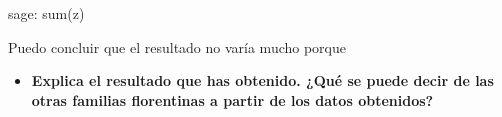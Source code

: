 \begin{sagecommandline}
    sage: sum(z)
\end{sagecommandline}

Puedo concluir que el resultado no varía mucho porque 

\newpage 
\begin{ejer}
    \begin{itemize}
        \item \textbf{Explica el resultado que has obtenido. ¿Qué se puede decir de las otras familias florentinas a partir de los datos obtenidos?}
    \end{itemize}
\end{ejer}
